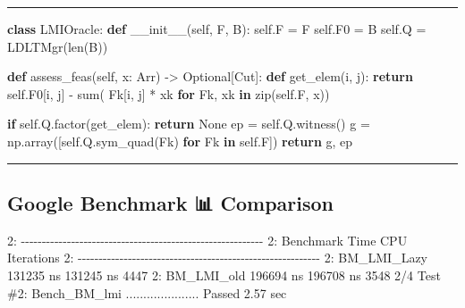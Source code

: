 \documentclass[
]{article}
\newenvironment{Shaded}{}{}
\newcommand{\BuiltInTok}[1]{\textcolor[rgb]{0.00,0.50,0.00}{#1}}
\newcommand{\ControlFlowTok}[1]{\textcolor[rgb]{0.00,0.44,0.13}{\textbf{#1}}}
\newcommand{\FunctionTok}[1]{\textcolor[rgb]{0.02,0.16,0.49}{#1}}
\newcommand{\KeywordTok}[1]{\textcolor[rgb]{0.00,0.44,0.13}{\textbf{#1}}}
\newcommand{\NormalTok}[1]{#1}
\newcommand{\OperatorTok}[1]{\textcolor[rgb]{0.40,0.40,0.40}{#1}}
\newcommand{\VariableTok}[1]{\textcolor[rgb]{0.10,0.09,0.49}{#1}}
\begin{document}
\begin{center}\rule{0.5\linewidth}{0.5pt}\end{center}

\begin{Shaded}
\begin{Highlighting}[]
\KeywordTok{class}\NormalTok{ LMIOracle:}
    \KeywordTok{def} \FunctionTok{\_\_init\_\_}\NormalTok{(}\VariableTok{self}\NormalTok{, F, B):}
        \VariableTok{self}\NormalTok{.F }\OperatorTok{=}\NormalTok{ F}
        \VariableTok{self}\NormalTok{.F0 }\OperatorTok{=}\NormalTok{ B}
        \VariableTok{self}\NormalTok{.Q }\OperatorTok{=}\NormalTok{ LDLTMgr(}\BuiltInTok{len}\NormalTok{(B))}

    \KeywordTok{def}\NormalTok{ assess\_feas(}\VariableTok{self}\NormalTok{, x: Arr) }\OperatorTok{{-}\textgreater{}}\NormalTok{ Optional[Cut]:}
        \KeywordTok{def}\NormalTok{ get\_elem(i, j):}
            \ControlFlowTok{return} \VariableTok{self}\NormalTok{.F0[i, j] }\OperatorTok{{-}} \BuiltInTok{sum}\NormalTok{(}
\NormalTok{                Fk[i, j] }\OperatorTok{*}\NormalTok{ xk }\ControlFlowTok{for}\NormalTok{ Fk, xk }\KeywordTok{in} \BuiltInTok{zip}\NormalTok{(}\VariableTok{self}\NormalTok{.F, x))}

        \ControlFlowTok{if} \VariableTok{self}\NormalTok{.Q.factor(get\_elem):}
            \ControlFlowTok{return} \VariableTok{None}
\NormalTok{        ep }\OperatorTok{=} \VariableTok{self}\NormalTok{.Q.witness()}
\NormalTok{        g }\OperatorTok{=}\NormalTok{ np.array([}\VariableTok{self}\NormalTok{.Q.sym\_quad(Fk) }\ControlFlowTok{for}\NormalTok{ Fk }\KeywordTok{in} \VariableTok{self}\NormalTok{.F])}
        \ControlFlowTok{return}\NormalTok{ g, ep}
\end{Highlighting}
\end{Shaded}

\begin{center}\rule{0.5\linewidth}{0.5pt}\end{center}

\subsection{Google Benchmark 📊
Comparison}\label{google-benchmark-comparison}

\begin{Shaded}
\begin{Highlighting}[]
\NormalTok{2: {-}{-}{-}{-}{-}{-}{-}{-}{-}{-}{-}{-}{-}{-}{-}{-}{-}{-}{-}{-}{-}{-}{-}{-}{-}{-}{-}{-}{-}{-}{-}{-}{-}{-}{-}{-}{-}{-}{-}{-}{-}{-}{-}{-}{-}{-}{-}{-}{-}{-}{-}{-}{-}{-}{-}{-}{-}{-}}
\NormalTok{2: Benchmark                Time             CPU   Iterations}
\NormalTok{2: {-}{-}{-}{-}{-}{-}{-}{-}{-}{-}{-}{-}{-}{-}{-}{-}{-}{-}{-}{-}{-}{-}{-}{-}{-}{-}{-}{-}{-}{-}{-}{-}{-}{-}{-}{-}{-}{-}{-}{-}{-}{-}{-}{-}{-}{-}{-}{-}{-}{-}{-}{-}{-}{-}{-}{-}{-}{-}}
\NormalTok{2: BM\_LMI\_Lazy         131235 ns       131245 ns         4447}
\NormalTok{2: BM\_LMI\_old          196694 ns       196708 ns         3548}
\NormalTok{2/4 Test \#2: Bench\_BM\_lmi .....................   Passed    2.57 sec}
\end{Highlighting}
\end{Shaded}
\end{document}
